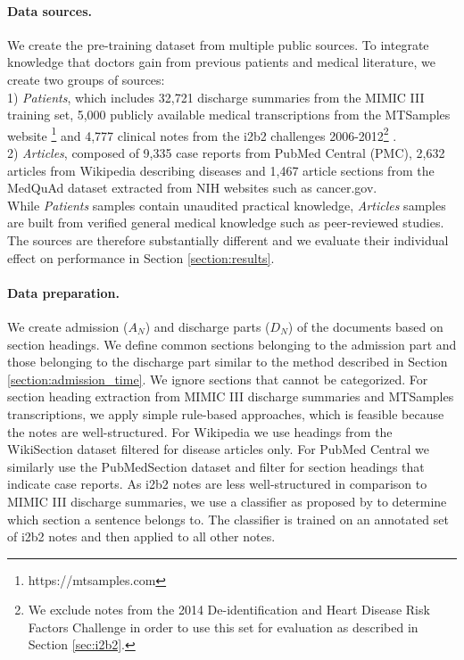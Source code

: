 \documentclass[11pt,a4paper]{article}
\begin{document}
\paragraph{Data sources.} We create the pre-training dataset from multiple public sources. To integrate knowledge that doctors gain from previous patients and medical literature, we create two groups of sources: \\1) \textit{Patients}, which includes 32,721 discharge summaries from the MIMIC III training set, 5,000 publicly available medical transcriptions from the MTSamples website \footnote{https://mtsamples.com} and 4,777 clinical notes from the i2b2 challenges 2006-2012\footnote{We exclude notes from the 2014 De-identification and Heart Disease Risk Factors Challenge in order to use this set for evaluation as described in Section \ref{sec:i2b2}.} \cite{i2b2-2006,i2b2-2006-2,i2b2-2009,i2b2-2009-2,i2b2-2010,i2b2-2011,i2b2-2012,i2b2-2012-2}.\\
2) \textit{Articles}, composed of 9,335 case reports from PubMed Central (PMC), 2,632 articles from Wikipedia describing diseases and 1,467 article sections from the MedQuAd dataset \cite{medquad} extracted from NIH websites such as cancer.gov.\\
While \textit{Patients} samples contain unaudited practical knowledge, \textit{Articles} samples are built from verified general medical knowledge such as peer-reviewed studies. The sources are therefore substantially different and we evaluate their individual effect on performance in Section \ref{section:results}.

\paragraph{Data preparation.} 
We create admission ($A_N$) and discharge parts ($D_N$) of the documents based on section headings. 
We define common sections belonging to the admission part and those belonging to the discharge part similar to the method described in Section \ref{section:admission_time}. We ignore sections that cannot be categorized. For section heading extraction from MIMIC III discharge summaries and MTSamples transcriptions, we apply simple rule-based approaches, which is feasible because the notes are well-structured. For Wikipedia we use headings from the WikiSection dataset \cite{sector} filtered for disease articles only. For PubMed Central we similarly use the PubMedSection dataset \cite{language-modeling-enough} and filter for section headings that indicate case reports. As i2b2 notes are less well-structured in comparison to MIMIC III discharge summaries, we use a classifier as proposed by \citet{i2b2-section-prediction} to determine which section a sentence belongs to. The classifier is trained on an annotated set of i2b2 notes and then applied to all other notes.
\end{document}

